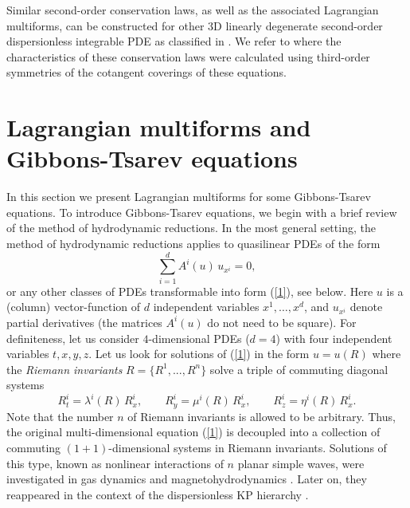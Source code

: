 \documentclass[12pt, a4paper]{article}
\theoremstyle{definition}
\begin{document}
Similar second-order conservation laws, as well as the associated Lagrangian multiforms, can be constructed for other 3D linearly degenerate second-order dispersionless integrable PDE as classified in \cite{ferapontov2015linearly}. We refer to \cite{baran2014higher, Morozov2022higher} where the characteristics of these conservation laws were calculated using third-order symmetries of the cotangent coverings of these equations.


\section{Lagrangian multiforms and Gibbons-Tsarev equations }
\label{sec3}

In this section we present Lagrangian multiforms for some Gibbons-Tsarev equations. To introduce Gibbons-Tsarev equations, we begin with a brief review of the method of hydrodynamic reductions.
In the most general setting, the method of hydrodynamic reductions applies to quasilinear PDEs of the form
\begin{equation}
\sum_{i=1}^d A^i(u)\, u_{x^i}=0,
\label{1}
\end{equation}
or any other classes of PDEs transformable into  form (\ref{1}), see below. Here $u$ is a (column) vector-function of $d$ independent variables $x^1, \dots, x^d$, and $u_{x^i}$ denote partial derivatives (the matrices $A^i(u)$ do not need to be square).
For definiteness, let us consider $4$-dimensional PDEs ($d=4$) with four independent variables  $t, x, y, z$. 
Let us look for  solutions of  (\ref{1}) in the form
${ u}={ u}(R)$  where the \emph{Riemann invariants}
$R=\{R^1, ..., R^n\}$ solve a triple of
commuting diagonal systems
\begin{equation}
R^i_t=\lambda^i(R)\, R^i_x, \qquad R^i_y=\mu^i(R)\, R^i_x, \qquad R^i_z=\eta^i(R)\,R^i_x.
\label{R}
\end{equation}
Note that the number $n$ of Riemann invariants is allowed to be
arbitrary.  Thus, the original  multi-dimensional equation (\ref{1}) is
decoupled into a collection of commuting  $(1+1)$-dimensional systems in Riemann invariants. 
Solutions of this type, known as nonlinear interactions of $n$ planar
simple waves, were  investigated in gas dynamics and
magnetohydrodynamics  \cite{burnat1970method, peradzynski1971nonlinear}. Later on, they 
reappeared in the context of the dispersionless KP hierarchy
\cite{kodama1989method, gibbons1996reductions, gibbons1999conformal}. 
\end{document}
